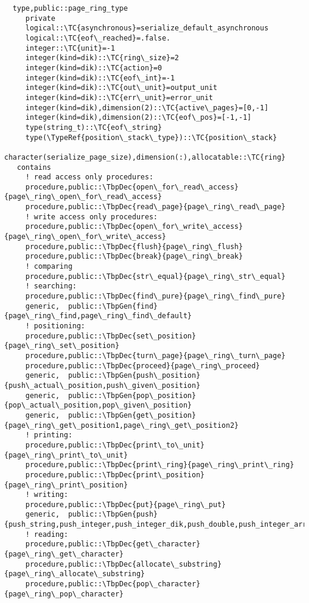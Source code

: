 \begin{Verbatim}
  type,public::page_ring_type
     private
     logical::\TC{asynchronous}=serialize_default_asynchronous
     logical::\TC{eof\_reached}=.false.
     integer::\TC{unit}=-1
     integer(kind=dik)::\TC{ring\_size}=2
     integer(kind=dik)::\TC{action}=0
     integer(kind=dik)::\TC{eof\_int}=-1
     integer(kind=dik)::\TC{out\_unit}=output_unit
     integer(kind=dik)::\TC{err\_unit}=error_unit
     integer(kind=dik),dimension(2)::\TC{active\_pages}=[0,-1]
     integer(kind=dik),dimension(2)::\TC{eof\_pos}=[-1,-1]
     type(string_t)::\TC{eof\_string}
     type(\TypeRef{position\_stack\_type})::\TC{position\_stack}
     character(serialize_page_size),dimension(:),allocatable::\TC{ring}
   contains
     ! read access only procedures:
     procedure,public::\TbpDec{open\_for\_read\_access}{page\_ring\_open\_for\_read\_access}
     procedure,public::\TbpDec{read\_page}{page\_ring\_read\_page}
     ! write access only procedures:
     procedure,public::\TbpDec{open\_for\_write\_access}{page\_ring\_open\_for\_write\_access}
     procedure,public::\TbpDec{flush}{page\_ring\_flush}
     procedure,public::\TbpDec{break}{page\_ring\_break}
     ! comparing
     procedure,public::\TbpDec{str\_equal}{page\_ring\_str\_equal}
     ! searching:
     procedure,public::\TbpDec{find\_pure}{page\_ring\_find\_pure}
     generic,  public::\TbpGen{find}{page\_ring\_find,page\_ring\_find\_default}
     ! positioning:
     procedure,public::\TbpDec{set\_position}{page\_ring\_set\_position}
     procedure,public::\TbpDec{turn\_page}{page\_ring\_turn\_page}
     procedure,public::\TbpDec{proceed}{page\_ring\_proceed}
     generic,  public::\TbpGen{push\_position}{push\_actual\_position,push\_given\_position}
     generic,  public::\TbpGen{pop\_position}{pop\_actual\_position,pop\_given\_position}
     generic,  public::\TbpGen{get\_position}{page\_ring\_get\_position1,page\_ring\_get\_position2}
     ! printing:
     procedure,public::\TbpDec{print\_to\_unit}{page\_ring\_print\_to\_unit}
     procedure,public::\TbpDec{print\_ring}{page\_ring\_print\_ring}
     procedure,public::\TbpDec{print\_position}{page\_ring\_print\_position}
     ! writing:
     procedure,public::\TbpDec{put}{page\_ring\_put}
     generic,  public::\TbpGen{push}{push_string,push_integer,push_integer_dik,push_double,push_integer_array,push_integer_array_dik,push_double_array}
     ! reading:
     procedure,public::\TbpDec{get\_character}{page\_ring\_get\_character}
     procedure,public::\TbpDec{allocate\_substring}{page\_ring\_allocate\_substring}
     procedure,public::\TbpDec{pop\_character}{page\_ring\_pop\_character}

\end{Verbatim}
